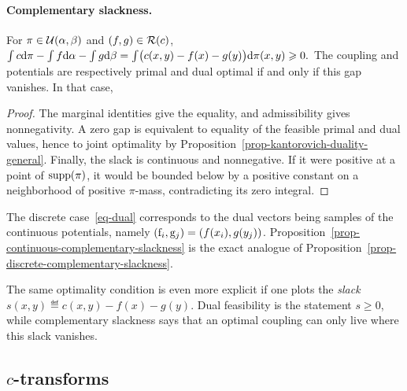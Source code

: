 \paragraph{Complementary slackness.}
\begin{prop}\label{prop-continuous-complementary-slackness}
For $\pi\in\mathcal{U}(\alpha,\beta)$ and $(f,g)\in\mathcal{R}(c)$, \(\int c\mathrm{d}\pi-\int f\mathrm{d}\alpha-\int g\mathrm{d}\beta = \int\bigl(c(x,y)-f(x)-g(y)\bigr)\mathrm{d}\pi(x,y) \geqslant0.\)
The coupling and potentials are respectively primal and dual optimal if and only if this gap vanishes. In that case,
\end{prop}
\begin{proof}
The marginal identities give the equality, and admissibility gives nonnegativity. A zero gap is equivalent to equality of the feasible primal and dual values, hence to joint optimality by Proposition~\ref{prop-kantorovich-duality-general}. Finally, the slack is continuous and nonnegative. If it were positive at a point of $\operatorname{supp}(\pi)$, it would be bounded below by a positive constant on a neighborhood of positive $\pi$-mass, contradicting its zero integral.
\end{proof}
The discrete case~\eqref{eq-dual} corresponds to the dual vectors being samples of the continuous potentials, namely $(\mathrm{f}_i,\mathrm{g}_j)=(f(x_i),g(y_j))$. Proposition~\ref{prop-continuous-complementary-slackness} is the exact analogue of Proposition~\ref{prop-discrete-complementary-slackness}.

The same optimality condition is even more explicit if one plots the \emph{slack}
\(s(x,y) \eqdef c(x,y)-f(x)-g(y).\)
Dual feasibility is the statement $s\geq0$, while complementary slackness says that an optimal coupling can only live where this slack vanishes.

\subsection{\texorpdfstring{$c$-transforms}{c-transforms}}
\label{sec-c-transfo}
